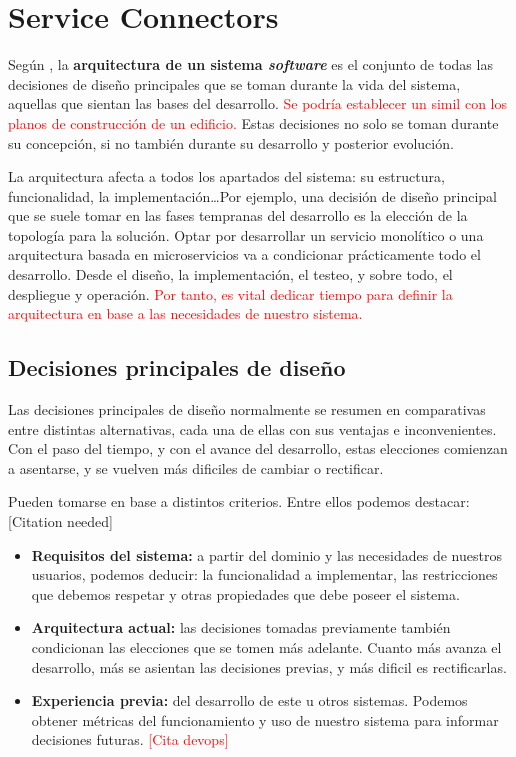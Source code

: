\chapter{Service Connectors}

Según \cite{taylorSoftwareArchitectureFoundations2009}, la {\bf arquitectura de un sistema \textit{software}} es el conjunto de todas las decisiones de diseño principales que se toman durante la vida del sistema, aquellas que sientan las bases del desarrollo. \textcolor{red}{Se podría establecer un simil con los planos de construcción de un edificio.} Estas decisiones no solo se toman durante su concepción, si no también durante su desarrollo y posterior evolución.

La arquitectura afecta a todos los apartados del sistema: su estructura, funcionalidad, la implementación\dots Por ejemplo, una decisión de diseño principal que se suele tomar en las fases tempranas del desarrollo es la elección de la topología para la solución. Optar por desarrollar un servicio monolítico o una arquitectura basada en microservicios va a condicionar prácticamente todo el desarrollo. Desde el diseño, la implementación, el testeo, y sobre todo, el despliegue y operación. \textcolor{red}{Por tanto, es vital dedicar tiempo para definir la arquitectura en base a las necesidades de nuestro sistema.}

\section{Decisiones principales de diseño}

Las decisiones principales de diseño normalmente se resumen en comparativas entre distintas alternativas, cada una de ellas con sus ventajas e inconvenientes. Con el paso del tiempo, y con el avance del desarrollo, estas elecciones comienzan a asentarse, y se vuelven más dificiles de cambiar o rectificar.

Pueden tomarse en base a distintos criterios. Entre ellos podemos destacar: [Citation needed]

    \begin{itemize}
        \item \textbf{Requisitos del sistema:} a partir del dominio y las necesidades de nuestros usuarios, podemos deducir: la funcionalidad a implementar, las restricciones que debemos respetar y otras propiedades que debe poseer el sistema.

        \item \textbf{Arquitectura actual:} las decisiones tomadas previamente también condicionan las elecciones que se tomen más adelante. Cuanto más avanza el desarrollo, más se asientan las decisiones previas, y más dificil es rectificarlas.

        \item \textbf{Experiencia previa:} del desarrollo de este u otros sistemas. Podemos obtener métricas del funcionamiento y uso de nuestro sistema para informar decisiones futuras. \textcolor{red}{[Cita devops]}
    \end{itemize}

